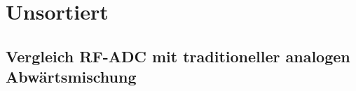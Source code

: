 \chapter{Unsortiert}






\section{Vergleich RF-ADC mit traditioneller analogen Abwärtsmischung}





   
















